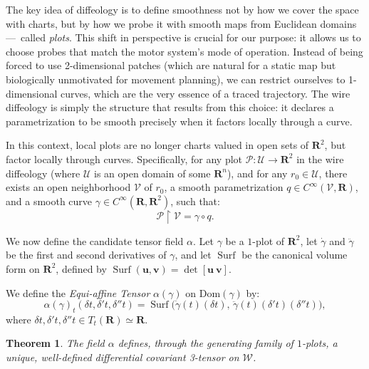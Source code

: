 \documentclass[10pt,letterpaper,reqno]{amsart}
\newcommand{\RR}{\mathbf{R}}
\newcommand{\Cinfty}{C^\infty}
\newcommand{\Dom}{\mathrm{Dom}}
\newcommand{\cU}{\mathcal{U}}
\newcommand{\cV}{\mathcal{V}}
\newcommand{\cW}{\mathcal{W}}
\newcommand{\cP}{\mathcal{P}}
\DeclareMathOperator{\surf}{Surf}
\newtheorem*{theorem}{Theorem} %
\begin{document}
  The key idea of diffeology is to define smoothness not by how we cover the space with charts,
  but by how we probe it with smooth maps from Euclidean domains ---~called \emph{plots}.
  This shift in perspective is crucial for our purpose:
  it allows us to choose probes that match the motor system's mode of operation.
  Instead of being forced to use 2-dimensional patches (which are natural for a static map but biologically unmotivated for movement planning),
  we can restrict ourselves to 1-dimensional curves,
  which are the very essence of a traced trajectory.
  The wire diffeology is simply the structure that results from this choice:
  it declares a parametrization to be smooth precisely when it factors locally through a curve.
    
  In this context,
  local plots are no longer charts valued in open sets of $\RR^2$,
  but factor locally through curves.
  Specifically,
  for any plot $\cP : \cU \to \RR^2$ in the wire diffeology (where $\cU$ is an open domain of some $\RR^n$),
  and for any $r_0 \in \cU$,
  there exists an open neighborhood $\cV$ of $r_0$,
  a smooth parametrization $q \in \Cinfty(\cV,\RR)$,
  and a smooth curve $\gamma \in \Cinfty(\RR, \RR^2)$,
  such that:
  \begin{equation}
    \cP \restriction \cV = \gamma \circ q.
  \end{equation}
  
  We now define the candidate tensor field $\alpha$.
  Let $\gamma$ be a $1$-plot of $\RR^2$,
  let $\dot \gamma$ and $\ddot \gamma$ be the first and second derivatives of $\gamma$,
  and let $\surf$ be the canonical volume form on $\RR^2$,
  defined by $\surf(\mathbf{u}, \mathbf{v}) = \det[\mathbf{u} \ \mathbf{v}]$.
  
  We define the \emph{Equi-affine Tensor} $\alpha(\gamma)$ on $\Dom(\gamma)$ by:
  \begin{equation}
    \alpha(\gamma)_t(\delta t, \delta't, \delta''t) =
    \surf\big(\dot\gamma(t)(\delta t), \, \ddot\gamma(t)(\delta't)(\delta''t)\big),
  \end{equation}
  where $\delta t, \delta't, \delta''t \in T_t(\RR) \simeq \RR$.
  
  \begin{theorem}
    The field $\alpha$ defines,
    through the generating family of $1$-plots,
    a unique, well-defined differential covariant 3-tensor on $\cW$.
  \end{theorem}
  
\end{document}
